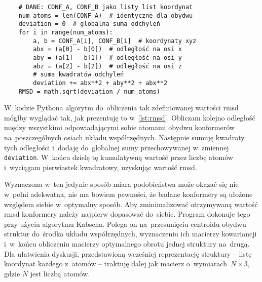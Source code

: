 \begin{listing}[b]
  \begin{lstlisting}
    # DANE: CONF_A, CONF_B jako listy list koordynat
    num_atoms = len(CONF_A)  # identyczne dla obydwu
    deviation = 0  # globalna suma odchyleń
    for i in range(num_atoms):
        a, b = CONF_A[i], CONF_B[i]  # koordynaty xyz
        abx = (a[0] - b[0])  # odległość na osi x
        aby = (a[1] - b[1])  # odległość na osi y
        abz = (a[2] - b[2])  # odległość na osi z
        # suma kwadratów odchyleń
        deviation += abx**2 + aby**2 + abx**2
    RMSD = math.sqrt(deviation / num_atoms)
  \end{lstlisting}
  \caption{
    Algorytm obliczania wartości \gls{rmsd} dwóch konformerów.
    Obydwie listy muszą składać się z~atomów ułożonych w~tym samym porządku.
    Zakładam, że konformer reprezentowany jest przez listę koordynat położenia każdego
      z~atomów w~trzech wymiarach, czyli \lstinline|CONF = [[x0, y0, z0], [x1, y1, z1], ...]|.
    Wyrażenie \lstinline|zmienna += wartość| oznacza dodanie danej wartości do~wartości zmiennej.
  }\label{lst:rmsd}
\end{listing}

W~kodzie Pythona algorytm do~obliczenia tak zdefiniowanej wartości \gls{rmsd} mógłby wyglądać
  tak, jak prezentuję to w~\cref{lst:rmsd}.
Obliczam kolejno odległość między wszystkimi odpowiadającymi sobie atomami obydwu konformerów
  na~poszczególnych osiach układu współrzędnych.
Następnie sumuję kwadraty tych odległości i~dodaję do~globalnej sumy przechowywanej
  w~zmiennej \lstinline|deviation|.
W~końcu dzielę tę kumulatywną wartość przez liczbę atomów i~wyciągam pierwiastek kwadratowy,
  uzyskując wartość \gls{rmsd}.

Wyznaczona w~ten jedynie sposób miara podobieństwa może okazać się nie w~pełni adekwatna,
  nie ma bowiem pewności, że badane konformery są ułożone względem siebie w~optymalny sposób.
Aby zminimalizować otrzymywaną wartość \gls{rmsd} konformery należy najpierw dopasować do~siebie.
Program \tesliper{} dokonuje tego przy użyciu algorytmu Kabscha.
Polega on na~przesunięciu centroidu obydwu struktur do~środka układu współrzędnych,
  wyznaczeniu ich macierzy kowariancji i~w~końcu obliczeniu macierzy optymalnego obrotu
  jednej struktury na~drugą.
Dla ułatwienia dyskusji, przedstawioną wcześniej reprezentację struktury \--- listę koordynat
  każdego z~atomów \--- traktuję dalej jak macierz o~wymiarach~$N \times 3$,
  gdzie $N$ jest liczbą atomów.

